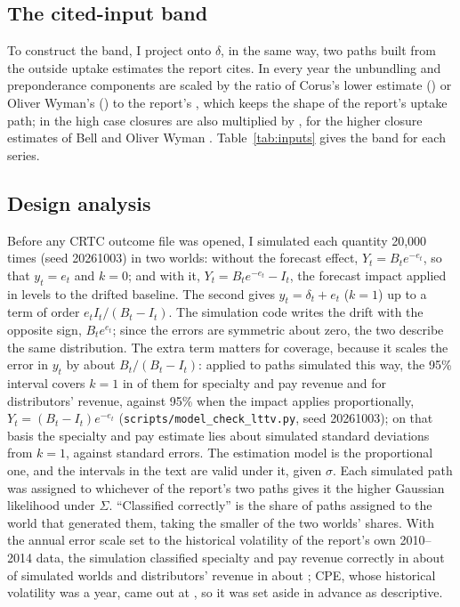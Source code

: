 \subsection*{The cited-input band}
To construct the band, I project onto \(\delta\), in the same way, two paths built from the outside uptake estimates the report cites. In every year the unbundling and preponderance components are scaled by the ratio of Corus's lower estimate (\lttvCitedUptakeLow{}) or Oliver Wyman's (\lttvCitedUptakeHigh{}) to the report's \lttvByopEighteen{}, which keeps the shape of the report's uptake path; in the high case closures are also multiplied by \lttvCitedClosuresMult{}, for the higher closure estimates of Bell and Oliver Wyman \citep[paras.~201, 230]{nordicity2015television}. Table~\ref{tab:inputs} gives the band for each series.

\subsection*{Design analysis}
Before any CRTC outcome file was opened, I simulated each quantity 20,000 times (seed 20261003) in two worlds: without the forecast effect, \(Y_t=B_te^{-e_t}\), so that \(y_t=e_t\) and \(k=0\); and with it, \(Y_t=B_te^{-e_t}-I_t\), the forecast impact applied in levels to the drifted baseline. The second gives \(y_t=\delta_t+e_t\) (\(k=1\)) up to a term of order \(e_tI_t/(B_t-I_t)\). The simulation code writes the drift with the opposite sign, \(B_te^{e_t}\); since the errors are symmetric about zero, the two describe the same distribution. The extra term matters for coverage, because it scales the error in \(y_t\) by about \(B_t/(B_t-I_t)\): applied to paths simulated this way, the 95\% interval covers \(k=1\) in \lttvCoverDollarsSpec{} of them for specialty and pay revenue and \lttvCoverDollarsBDU{} for distributors' revenue, against 95\% when the impact applies proportionally, \(Y_t=(B_t-I_t)e^{-e_t}\) (\texttt{scripts/model\_check\_lttv.py}, seed 20261003); on that basis the specialty and pay estimate lies about \lttvKSpecSEsFromOneDollars{} simulated standard deviations from \(k=1\), against \lttvKSpecSEsFromOne{} standard errors. The estimation model is the proportional one, and the intervals in the text are valid under it, given \(\sigma\). Each simulated path was assigned to whichever of the report's two paths gives it the higher Gaussian likelihood under \(\Sigma\). \enquote{Classified correctly} is the share of paths assigned to the world that generated them, taking the smaller of the two worlds' shares. With the annual error scale set to the historical volatility of the report's own 2010--2014 data, the simulation classified specialty and pay revenue correctly in about \lttvDesignCorrectSpec{} of simulated worlds and distributors' revenue in about \lttvDesignCorrectBDU{}; CPE, whose historical volatility was \lttvHistSDCPE{} a year, came out at \lttvDesignCorrectCPE{}, so it was set aside in advance as descriptive.

